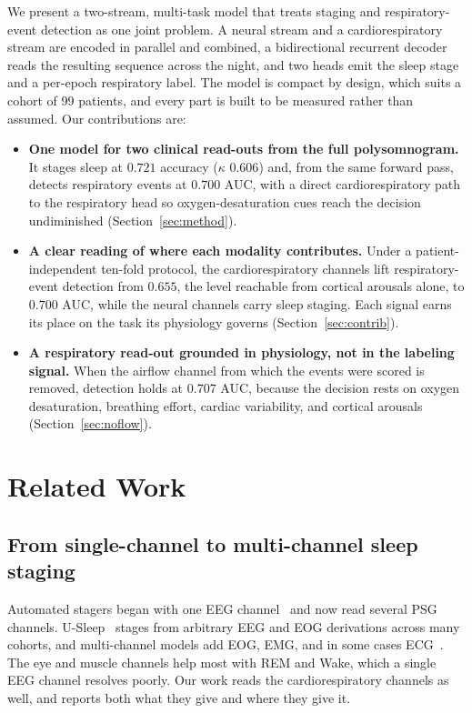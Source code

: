 \documentclass[journal]{IEEEtran}
\newcommand{\mmAcc}{0.721}   %
\newcommand{\mmK}{0.606}     %
\newcommand{\mmAuc}{0.700}   %
\newcommand{\eegAuc}{0.655}  %
\newcommand{\noflowAuc}{0.707} %
\begin{document}
We present a two-stream, multi-task model that treats staging and respiratory-event
detection as one joint problem. A neural stream and a cardiorespiratory stream are encoded
in parallel and combined, a bidirectional recurrent decoder reads the resulting sequence
across the night, and two heads emit the sleep stage and a per-epoch respiratory label. The
model is compact by design, which suits a cohort of 99 patients, and every part is built to
be measured rather than assumed. Our contributions are:

\begin{itemize}
\item \textbf{One model for two clinical read-outs from the full polysomnogram.} It stages
sleep at $\mmAcc$ accuracy ($\kappa$ $\mmK$) and, from the same forward pass, detects
respiratory events at $\mmAuc$ AUC, with a direct cardiorespiratory path to the respiratory
head so oxygen-desaturation cues reach the decision undiminished (Section~\ref{sec:method}).
\item \textbf{A clear reading of where each modality contributes.} Under a
patient-independent ten-fold protocol, the cardiorespiratory channels lift respiratory-event
detection from $\eegAuc$, the level reachable from cortical arousals alone, to $\mmAuc$
AUC, while the neural channels carry sleep staging. Each signal earns its place on the task
its physiology governs (Section~\ref{sec:contrib}).
\item \textbf{A respiratory read-out grounded in physiology, not in the labeling signal.}
When the airflow channel from which the events were scored is removed, detection holds at
$\noflowAuc$ AUC, because the decision rests on oxygen desaturation, breathing effort,
cardiac variability, and cortical arousals (Section~\ref{sec:noflow}).
\end{itemize}

\section{Related Work}
\label{sec:related}

\subsection{From single-channel to multi-channel sleep staging}
Automated stagers began with one EEG channel~\cite{supratak2017deepsleepnet,
phan2019seqsleepnet,eldele2021attnsleep} and now read several PSG channels.
U-Sleep~\cite{perslev2021usleep} stages from arbitrary EEG and EOG derivations across many
cohorts, and multi-channel models add EOG, EMG, and in some cases
ECG~\cite{phan2021xsleepnet,biot2023,sleepfm2026}. The eye and muscle channels help most
with REM and Wake, which a single EEG channel resolves poorly. Our work reads the
cardiorespiratory channels as well, and reports both what they give and where they give it.
\end{document}

